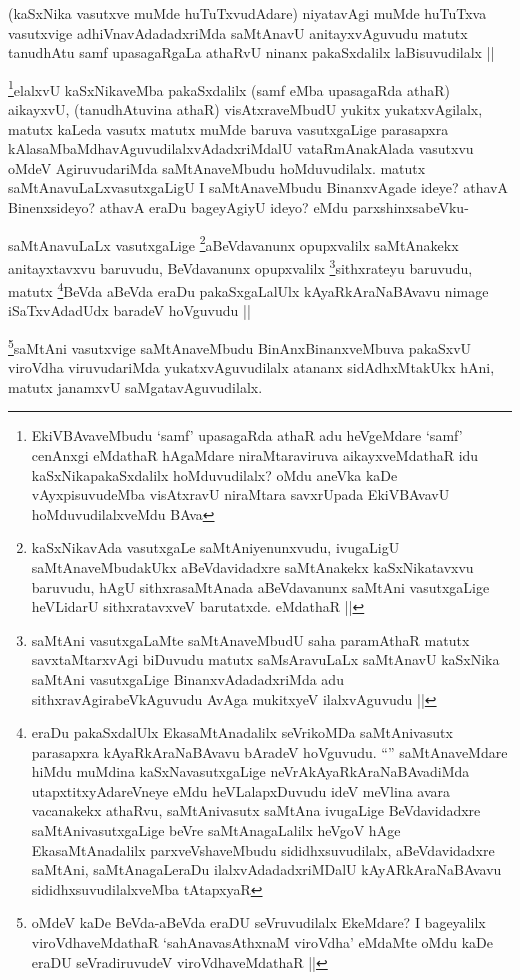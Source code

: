 \begin{artha}
(kaSxNika vasutxve muMde huTuTxvudAdare) niyatavAgi muMde huTuTxva vasutxvige adhiVnavAdadadxriMda saMtAnavU anitayxvAguvudu matutx tanudhAtu samf upasagaRgaLa athaRvU ninanx pakaSxdalilx laBisuvudilalx ||
\end{artha}

\begin{artha}
\footnote{EkiVBAvaveMbudu `samf' upasagaRda athaR adu heVgeMdare `samf' cenAnxgi eMdathaR hAgaMdare niraMtaraviruva aikayxveMdathaR idu kaSxNikapakaSxdalilx hoMduvudilalx? oMdu aneVka kaDe vAyxpisuvudeMba visAtxravU niraMtara savxrUpada EkiVBAvavU hoMduvudilalxveMdu BAva}elalxvU kaSxNikaveMba pakaSxdalilx (samf eMba upasagaRda athaR) aikayxvU, (tanudhAtuvina athaR) visAtxraveMbudU yukitx yukatxvAgilalx, matutx kaLeda vasutx matutx muMde baruva vasutxgaLige parasapxra kAlasaMbaMdhavAguvudilalxvAdadxriMdalU vataRmAnakAlada vasutxvu oMdeV AgiruvudariMda saMtAnaveMbudu hoMduvudilalx. matutx saMtAnavuLaLxvasutxgaLigU I saMtAnaveMbudu BinanxvAgade ideye? athavA Binenxsideyo? athavA eraDu bageyAgiyU ideyo? eMdu parxshinxsabeVku-
\end{artha}

\begin{artha}
saMtAnavuLaLx vasutxgaLige \footnote{kaSxNikavAda vasutxgaLe saMtAniyenunxvudu, ivugaLigU saMtAnaveMbudakUkx aBeVdavidadxre saMtAnakekx kaSxNikatavxvu baruvudu, hAgU sithxrasaMtAnada aBeVdavanunx saMtAni vasutxgaLige heVLidarU sithxratavxveV barutatxde. eMdathaR ||}aBeVdavanunx opupxvalilx saMtAnakekx anitayxtavxvu baruvudu, BeVdavanunx opupxvalilx \footnote{saMtAni vasutxgaLaMte saMtAnaveMbudU saha paramAthaR matutx savxtaMtarxvAgi biDuvudu matutx saMsAravuLaLx saMtAnavU kaSxNika saMtAni vasutxgaLige BinanxvAdadadxriMda adu sithxravAgirabeVkAguvudu AvAga mukitxyeV ilalxvAguvudu ||}sithxrateyu baruvudu, matutx \footnote{eraDu pakaSxdalUlx EkasaMtAnadalilx seVrikoMDa saMtAnivasutx parasapxra kAyaRkAraNaBAvavu bAradeV hoVguvudu. ``\stext'' saMtAnaveMdare hiMdu muMdina kaSxNavasutxgaLige neVrAkAyaRkAraNaBAvadiMda utapxtitxyAdareVneye eMdu heVLalapxDuvudu ideV meVlina avara vacanakekx athaRvu, saMtAnivasutx saMtAna ivugaLige BeVdavidadxre saMtAnivasutxgaLige beVre saMtAnagaLalilx heVgoV hAge EkasaMtAnadalilx parxveVshaveMbudu sididhxsuvudilalx, aBeVdavidadxre saMtAni, saMtAnagaLeraDu ilalxvAdadadxriMDalU kAyARkAraNaBAvavu sididhxsuvudilalxveMba tAtapxyaR}BeVda aBeVda eraDu pakaSxgaLalUlx kAyaRkAraNaBAvavu nimage iSaTxvAdadUdx baradeV hoVguvudu ||
\end{artha}

\begin{artha}
\footnote{oMdeV kaDe BeVda-aBeVda eraDU seVruvudilalx EkeMdare? I bageyalilx viroVdhaveMdathaR `sahAnavasAthxnaM viroVdha' eMdaMte oMdu kaDe eraDU seVradiruvudeV viroVdhaveMdathaR ||}saMtAni vasutxvige saMtAnaveMbudu BinAnxBinanxveMbuva pakaSxvU viroVdha viruvudariMda yukatxvAguvudilalx atananx sidAdhxMtakUkx hAni, matutx janamxvU saMgatavAguvudilalx.
\end{artha}


